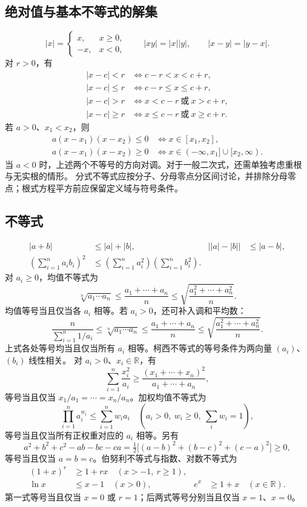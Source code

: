 \documentclass[../main.tex]{subfiles}
\begin{document}
\subsection{绝对值与基本不等式的解集}
\[
|x|=\begin{cases}x,&x\ge0,\\-x,&x<0,\end{cases}\qquad
|xy|=|x||y|,\qquad |x-y|=|y-x|.
\]
对 $r>0$，有
\begin{align*}
|x-c|<r&\iff c-r<x<c+r,\\
|x-c|\le r&\iff c-r\le x\le c+r,\\
|x-c|>r&\iff x<c-r\ \text{或}\ x>c+r,\\
|x-c|\ge r&\iff x\le c-r\ \text{或}\ x\ge c+r.
\end{align*}
若 $a>0$、$x_1<x_2$，则
\begin{align*}
a(x-x_1)(x-x_2)\le0&\iff x\in[x_1,x_2],\\
a(x-x_1)(x-x_2)\ge0&\iff x\in(-\infty,x_1]\cup[x_2,\infty).
\end{align*}
当 $a<0$ 时，上述两个不等号的方向对调。对于一般二次式，还需单独考虑重根与无实根的情形。
分式不等式应按分子、分母零点分区间讨论，并排除分母零点；根式方程平方前应保留定义域与符号条件。
\subsection{不等式}
\begin{align*}
|a+b|&\le |a|+|b|, & \bigl||a|-|b|\bigr|&\le |a-b|,\\
\left(\sum_{i=1}^n a_ib_i\right)^2&\le\left(\sum_{i=1}^n a_i^2\right)\left(\sum_{i=1}^n b_i^2\right).
\end{align*}
对 $a_i\ge0$，均值不等式为
\[
\sqrt[n]{a_1\cdots a_n}\le\frac{a_1+\cdots+a_n}{n}\le\sqrt{\frac{a_1^2+\cdots+a_n^2}{n}}.
\]
均值等号当且仅当各 $a_i$ 相等。若 $a_i>0$，还可补入调和平均数：
\[
\frac{n}{\sum_{i=1}^n1/a_i}
\le\sqrt[n]{a_1\cdots a_n}
\le\frac{a_1+\cdots+a_n}{n}
\le\sqrt{\frac{a_1^2+\cdots+a_n^2}{n}}.
\]
上式各处等号均当且仅当所有 $a_i$ 相等。柯西不等式的等号条件为两向量 $(a_i)$、$(b_i)$ 线性相关。
对 $a_i>0$、$x_i\in\mathbb R$，有
\[
\sum_{i=1}^n\frac{x_i^2}{a_i}\ge
\frac{(x_1+\cdots+x_n)^2}{a_1+\cdots+a_n},
\]
等号当且仅当 $x_1/a_1=\cdots=x_n/a_n$。加权均值不等式为
\[
\prod_{i=1}^na_i^{w_i}\le\sum_{i=1}^nw_i a_i
\quad(a_i>0,\ w_i\ge0,\ \textstyle\sum_iw_i=1),
\]
等号当且仅当所有正权重对应的 $a_i$ 相等。另有
\[
a^2+b^2+c^2-ab-bc-ca
=\tfrac12\bigl[(a-b)^2+(b-c)^2+(c-a)^2\bigr]\ge0,
\]
等号当且仅当 $a=b=c$。伯努利不等式与指数、对数不等式为
\begin{align*}
(1+x)^r&\ge1+rx\quad(x>-1,\ r\ge1),\\
\ln x&\le x-1\quad(x>0), & e^x&\ge1+x\quad(x\in\mathbb R).
\end{align*}
第一式等号当且仅当 $x=0$ 或 $r=1$；后两式等号分别当且仅当 $x=1$、$x=0$。
\enlargethispage{\baselineskip}
\end{document}
